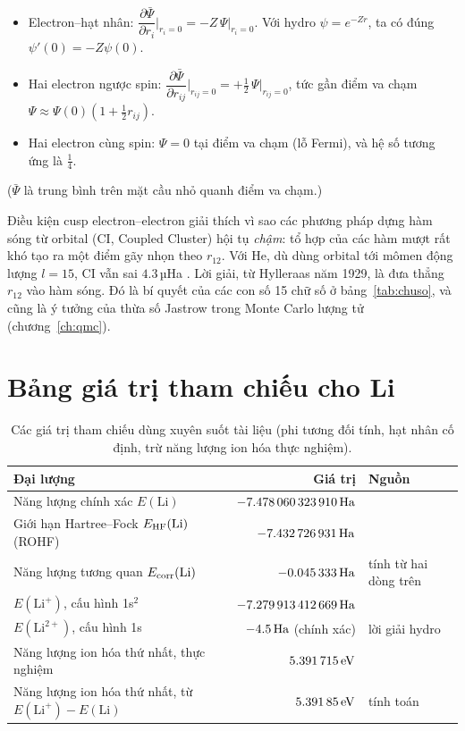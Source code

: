 \begin{congthuc}
\begin{itemize}
\item Electron--hạt nhân: $\dfrac{\partial\bar\Psi}{\partial r_i}\Big|_{r_i=0}=-Z\,\Psi\big|_{r_i=0}$. Với hydro $\psi=e^{-Zr}$, ta có đúng $\psi'(0)=-Z\psi(0)$.
\item Hai electron ngược spin: $\dfrac{\partial\bar\Psi}{\partial r_{ij}}\Big|_{r_{ij}=0}=+\tfrac12\,\Psi\big|_{r_{ij}=0}$, tức gần điểm va chạm $\Psi\approx\Psi(0)(1+\tfrac12r_{ij})$.
\item Hai electron cùng spin: $\Psi=0$ tại điểm va chạm (lỗ Fermi), và hệ số tương ứng là $\tfrac14$.
\end{itemize}
($\bar\Psi$ là trung bình trên mặt cầu nhỏ quanh điểm va chạm.)
\end{congthuc}

Điều kiện cusp electron--electron giải thích vì sao các phương pháp dựng hàm sóng từ orbital (CI, Coupled Cluster) hội tụ \emph{chậm}: tổ hợp của các hàm mượt rất khó tạo ra một điểm gãy nhọn theo $r_{12}$. Với He, dù dùng orbital tới mômen động lượng $l=15$, CI vẫn sai $4.3$\,µHa \cite{Ruiz2021}. Lời giải, từ Hylleraas năm 1929, là đưa thẳng $r_{12}$ vào hàm sóng. Đó là bí quyết của các con số 15 chữ số ở bảng~\ref{tab:chuso}, và cũng là ý tưởng của thừa số Jastrow trong Monte Carlo lượng tử (chương~\ref{ch:qmc}).

\section{Bảng giá trị tham chiếu cho Li}

\begin{table}[h]
\centering\small
\caption{Các giá trị tham chiếu dùng xuyên suốt tài liệu (phi tương đối tính, hạt nhân cố định, trừ năng lượng ion hóa thực nghiệm).}
\label{tab:thamchieu}
\begin{tabularx}{\textwidth}{@{}Xrl@{}}
\toprule
Đại lượng & Giá trị & Nguồn \\
\midrule
Năng lượng chính xác $E(\text{Li})$ & $-7.478\,060\,323\,910\,\mathrm{Ha}$ & \cite{Wang2012,PKP2009} \\
Giới hạn Hartree--Fock $E_{\mathrm{HF}}(\text{Li})$ (ROHF) & $-7.432\,726\,931\,\mathrm{Ha}$ & \cite{KogaThakkar1996} \\
Năng lượng tương quan $E_{\mathrm{corr}}(\text{Li})$ & $-0.045\,333\,\mathrm{Ha}$ & tính từ hai dòng trên \\
$E(\text{Li}^+)$, cấu hình 1s$^2$ & $-7.279\,913\,412\,669\,\mathrm{Ha}$ & \cite{Nakashima2007} \\
$E(\text{Li}^{2+})$, cấu hình 1s & $-4.5\,\mathrm{Ha}$ (chính xác) & lời giải hydro \\
Năng lượng ion hóa thứ nhất, thực nghiệm & $5.391\,715\,\mathrm{eV}$ & \cite{NIST-ASD} \\
Năng lượng ion hóa thứ nhất, từ $E(\text{Li}^+)-E(\text{Li})$ & $5.391\,85\,\mathrm{eV}$ & tính toán \\
\bottomrule
\end{tabularx}
\end{table}

